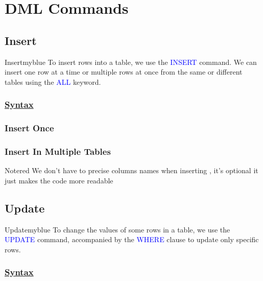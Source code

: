 
\section{DML Commands}

\subsection{Insert}

\begin{prettyBox}{Insert}{myblue}
To insert rows into a table, we use the \textcolor{blue}{INSERT} command. We can insert one row at a time or multiple rows at once from the same or different tables using the \textcolor{blue}{ALL} keyword.
\end{prettyBox}

\subsubsection*{\underline{\textbf{Syntax}}}

\subsubsection*{\textbf{Insert Once}}



\subsubsection*{\textbf{Insert In Multiple Tables}}



\begin{prettyBox}{Note}{red}
We don't have to precise columns names when inserting , it's optional it just makes the code more readable
\end{prettyBox}

\subsection{Update}
\begin{prettyBox}{Update}{myblue}
To change the values of some rows in a table, we use the \textcolor{blue}{UPDATE} command, accompanied by the \textcolor{blue}{WHERE} clause to update only specific rows.
\end{prettyBox}

\subsubsection*{\underline{\textbf{Syntax}}}

